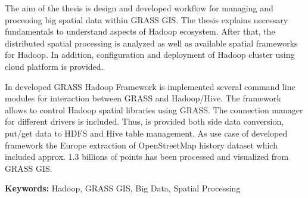 \documentclass[a4paper,12pt,oneside]{report}
\author{Matěj Krejčí}
\newenvironment{abstractpage}
{\cleardoublepage\vspace*{\fill}\thispagestyle{empty}}
{\vfill\cleardoublepage}
\newenvironment{abstractx}[1]
{\bigskip\selectlanguage{#1}%
	\begin{center}\bfseries\abstractname\end{center}}
{\par\bigskip}
\newcommand{\klicslova}[2]{\noindent\textbf{#1: }#2}
\begin{document}
	\pagestyle{empty}
	
	\renewcommand*\listfigurename{List of figures}
	 
	\renewcommand*\listtablename{List of  Tables}
	
	\renewcommand{\bibname}{References}
	\renewcommand{\contentsname}{Content}
	\renewcommand{\figurename}{Fig.}
	\renewcommand{\tablename}{Tab.}
	
	
	
	
	\renewcommand\footnotelayout{\footnotesize}
	
	
	
	\newpage
	
	\newpage
	\begin{abstractpage}
		\begin{abstractx}{english}
			
			The aim of the thesis is design and developed workflow for managing and processing big spatial data within GRASS GIS. The thesis explains necessary fundamentals to understand aspects of Hadoop ecosystem. After that, the  distributed spatial processing is analyzed as well as available spatial frameworks for Hadoop. In addition, configuration
			and deployment of Hadoop cluster using cloud platform is provided.
			
			In developed GRASS Hadoop Framework is implemented several command line  modu\-les for interaction between GRASS and Hadoop/Hive. The framework allows to control Hadoop spatial libraries using GRASS. The connection manager for different drivers is included. Thus, 
			is provided both side data conversion, put/get data to HDFS and Hive table management. As use case of developed framework the Europe extraction of OpenStreetMap history dataset which included approx. 1.3 billions of points has been processed and visualized from GRASS GIS.
			
			\klicslova{Keywords}{Hadoop, GRASS GIS, Big Data, Spatial Processing}
		\end{abstractx}
	\end{abstractpage}
	
	
	
\end{document}
